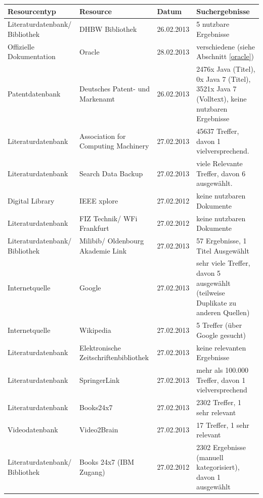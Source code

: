 \renewcommand{\arraystretch}{1.5}
\begin{longtable}{p{3.6cm}|p{3.5cm}|l|p{3.5cm}}
Resourcentyp & Resource & Datum & Suchergebnisse\\\hline\endhead
\endfoot\endlastfoot
Literaturdatenbank/ Bibliothek & DHBW Bibliothek & 26.02.2013 & 5 nutzbare Ergebnisse\\
Offizielle Dokumentation & Oracle & 28.02.2013 & verschiedene (siehe Abschnitt \ref{oracle})\\
Patentdatenbank & Deutsches Patent- und Markenamt & 26.02.2013 & 2476x Java (Titel), 0x Java 7 (Titel), 3521x Java 7 (Volltext), keine nutzbaren Ergebnisse\\
Literaturdatenbank & Association for Computing Machinery & 27.02.2013 & 45637 Treffer, davon 1 vielversprechend.\\
Literaturdatenbank & Search Data Backup & 27.02.2013 & viele Relevante Treffer, davon 6 ausgewählt.\\
Digital Library & IEEE xplore & 27.02.2012 & keine nutzbaren Dokumente\\
Literaturdatenbank & FIZ Technik/ WFi Frankfurt & 27.02.2012 & keine nutzbaren Dokumente\\
Literaturdatenbank/ Bibliothek & Milibib/ Oldenbourg Akademie Link & 27.02.2013 & 57 Ergebnisse, 1 Titel Ausgewählt\\
Internetquelle & Google & 27.02.2013 & sehr viele Treffer, davon 5 ausgewählt (teilweise Duplikate zu anderen Quellen)\\
Internetquelle & Wikipedia & 27.02.2013 & 5 Treffer (über Google gesucht)\\
Literaturdatenbank & Elektronische Zeitschriftenbibliothek & 27.02.2013 & keine relevanten Ergebnisse\\
Literaturdatenbank & SpringerLink & 27.02.2013 & mehr als 100.000 Treffer, davon 1 vielversprechend\\
Literaturdatenbank & Books24x7 & 27.02.2013 & 2302 Treffer, 1 sehr relevant\\
Videodatenbank & Video2Brain & 27.02.2013 & 17 Treffer, 1 sehr relevant\\
Literaturdatenbank/ Bibliothek & Books 24x7 (IBM Zugang) & 27.02.2012 & 2302 Ergebnisse (manuell kategorisiert), davon 1 ausgewählt\\
\end{longtable}
\renewcommand{\arraystretch}{1}


